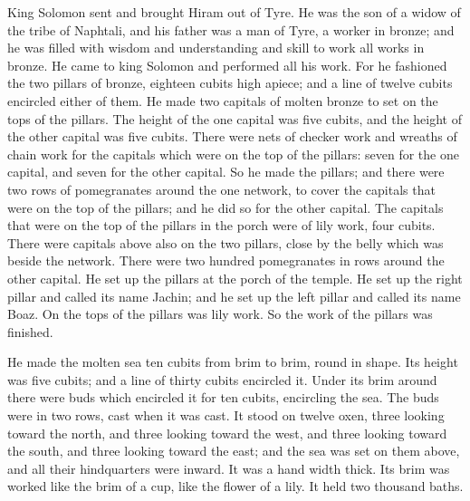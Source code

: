 King Solomon sent and brought Hiram out of Tyre.
 He was the son of a widow of the tribe of Naphtali, and
his father was a man of Tyre, a worker in bronze; and he was filled with
wisdom and understanding and skill to work all works in bronze. He came
to king Solomon and performed all his work.  For he
fashioned the two pillars of bronze, eighteen cubits high apiece; and a
line of twelve cubits encircled either of them.  He made
two capitals of molten bronze to set on the tops of the pillars. The
height of the one capital was five cubits, and the height of the other
capital was five cubits.  There were nets of checker work
and wreaths of chain work for the capitals which were on the top of the
pillars: seven for the one capital, and seven for the other capital.
 So he made the pillars; and there were two rows of
pomegranates around the one network, to cover the capitals that were on
the top of the pillars; and he did so for the other capital.
 The capitals that were on the top of the pillars in the
porch were of lily work, four cubits.  There were
capitals above also on the two pillars, close by the belly which was
beside the network. There were two hundred pomegranates in rows around
the other capital.  He set up the pillars at the porch of
the temple. He set up the right pillar and called its name Jachin; and
he set up the left pillar and called its name Boaz.  On
the tops of the pillars was lily work. So the work of the pillars was
finished.

 He made the molten sea ten cubits from brim to brim,
round in shape. Its height was five cubits; and a line of thirty cubits
encircled it.  Under its brim around there were buds
which encircled it for ten cubits, encircling the sea. The buds were in
two rows, cast when it was cast.  It stood on twelve
oxen, three looking toward the north, and three looking toward the west,
and three looking toward the south, and three looking toward the east;
and the sea was set on them above, and all their hindquarters were
inward.  It was a hand width thick. Its brim was worked
like the brim of a cup, like the flower of a lily. It held two thousand
baths.

